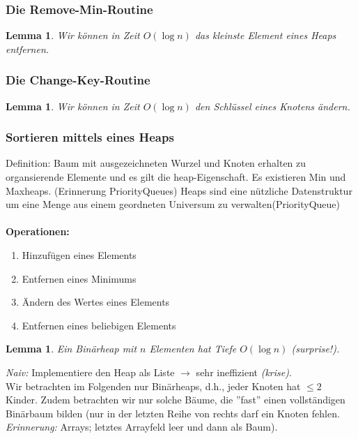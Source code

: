 \documentclass{article}
\newtheorem{lem}[thm]{Lemma}
\begin{document}
\subsubsection{Die Remove-Min-Routine}
\begin{lem}
Wir können in Zeit $O(\log n)$ das kleinste Element eines Heaps entfernen.
\end{lem}

\subsubsection{Die Change-Key-Routine}

\begin{lem}
Wir können in Zeit $O(\log n)$ den Schlüssel eines Knotens ändern.
\end{lem}


\subsubsection{Sortieren mittels eines Heaps}
Definition: Baum mit ausgezeichneten Wurzel und Knoten erhalten zu organsierende Elemente und es gilt die heap-Eigenschaft.
Es existieren Min und Maxheaps. (Erinnerung PriorityQueues)
Heaps sind eine nützliche Datenstruktur um eine Menge aus einem geordneten Universum zu verwalten(PriorityQueue) \\
\\
\textbf{Operationen:}
\begin{enumerate}
    \item Hinzufügen eines Elements
    \item Entfernen eines Minimums
    \item Ändern des Wertes eines Elements
    \item Entfernen eines beliebigen Elements
\end{enumerate} 
\vspace{1cm}
\begin{lem}
Ein Binärheap mit $n$ Elementen hat Tiefe $O(\log n)$ (surprise!).
\end{lem}
\textit{Naiv:} Implementiere den Heap als Liste \(\rightarrow\) sehr ineffizient \textit{(krise)}. \\

Wir betrachten im Folgenden nur Binärheaps, d.h., jeder Knoten hat \(\leq 2\) Kinder. Zudem betrachten wir nur solche Bäume, die ''fast'' einen vollständigen Binärbaum bilden (nur in der letzten Reihe von rechts darf ein Knoten fehlen. \\ \textit{Erinnerung:} Arrays; letztes Arrayfeld leer und dann als Baum).\\
\end{document}
